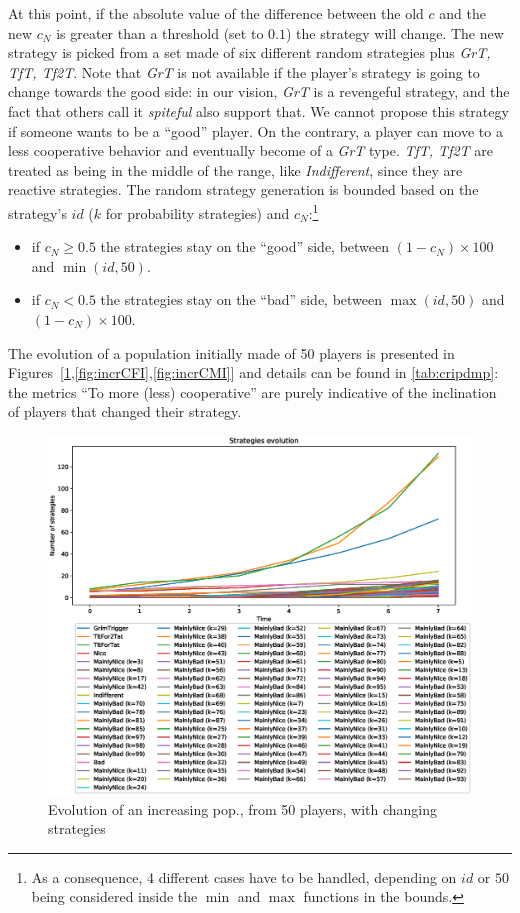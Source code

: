 \documentclass[journal,10pt,twoside]{IEEEtran}
\begin{document}
At this point, if the absolute value of the difference between the old $c$ and the new $c_N$ is greater than a threshold (set to $0.1$) the strategy will change. 
The new strategy is picked from a set made of six different random strategies plus \textit{GrT, TfT, Tf2T}.
Note that \textit{GrT} is not available if the player's strategy is going to change towards the good side: in our vision, \textit{GrT} is a revengeful strategy, and the fact that others call it \textit{spiteful} also support that. We cannot propose this strategy if someone wants to be a ``good'' player. On the contrary, a player can move to a less cooperative behavior and eventually become of a \textit{GrT} type.
\textit{TfT, Tf2T} are treated as being in the middle of the range, like \textit{Indifferent}, since they are reactive strategies.
The random strategy generation is bounded based on the strategy's $id$ ($k$ for probability strategies) and $c_N$:\footnote{As a consequence, 4 different cases have to be handled, depending on $id$ or $50$ being considered inside the $\min$ and $\max$ functions in the bounds.}
\begin{itemize}
    \item if $c_N \ge 0.5$ the strategies stay on the ``good'' side, between $(1-c_N)\times 100$ and $\min(id,50)$.
    \item if $c_N < 0.5$ the strategies stay on the ``bad'' side, between $\max(id,50)$ and $(1-c_N)\times 100$.
\end{itemize}

The evolution of a population initially made of 50 players is presented in Figures~[\ref{fig:incrC},\ref{fig:incrCFI},\ref{fig:incrCMI}] and details can be found in \autoref{tab:cripdmp}: the metrics ``To more (less) cooperative'' are purely indicative of the inclination of players that changed their strategy.

\begin{figure}[!ht]
    \centering
    \includegraphics[width=1\columnwidth]{../img/cipdmp-incr/alt1/cipdmp-evolution-increasing-pop-50}
    \caption{Evolution of an increasing pop., from 50 players, with changing strategies}
    \label{fig:incrC}
\end{figure}
\end{document}
